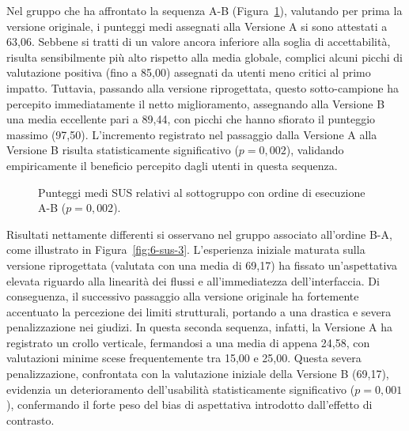 Nel gruppo che ha affrontato la sequenza A-B (Figura~\ref{fig:6-sus-2}), valutando per prima la versione originale, i punteggi medi assegnati alla Versione A si sono attestati a 63,06. Sebbene si tratti di un valore ancora inferiore alla soglia di accettabilità, risulta sensibilmente più alto rispetto alla media globale, complici alcuni picchi di valutazione positiva (fino a 85,00) assegnati da utenti meno critici al primo impatto. Tuttavia, passando alla versione riprogettata, questo sotto-campione ha percepito immediatamente il netto miglioramento, assegnando alla Versione B una media eccellente pari a 89,44, con picchi che hanno sfiorato il punteggio massimo (97,50). L'incremento registrato nel passaggio dalla Versione A alla Versione B risulta statisticamente significativo ($p = 0{,}002$), validando empiricamente il beneficio percepito dagli utenti in questa sequenza.

\begin{figure}[H]
	\centering
	\caption{Punteggi medi SUS relativi al sottogruppo con ordine di esecuzione A-B ($p = 0{,}002$).}
	\label{fig:6-sus-2}
\end{figure}

Risultati nettamente differenti si osservano nel gruppo associato all'ordine B-A, come illustrato in Figura~\ref{fig:6-sus-3}. L'esperienza iniziale maturata sulla versione riprogettata (valutata con una media di 69,17) ha fissato un'aspettativa elevata riguardo alla linearità dei flussi e all'immediatezza dell'interfaccia. Di conseguenza, il successivo passaggio alla versione originale ha fortemente accentuato la percezione dei limiti strutturali, portando a una drastica e severa penalizzazione nei giudizi. In questa seconda sequenza, infatti, la Versione A ha registrato un crollo verticale, fermandosi a una media di appena 24,58, con valutazioni minime scese frequentemente tra 15,00 e 25,00. Questa severa penalizzazione, confrontata con la valutazione iniziale della Versione B (69,17), evidenzia un deterioramento dell'usabilità statisticamente significativo ($p = 0{,}001$), confermando il forte peso del bias di aspettativa introdotto dall'effetto di contrasto.

